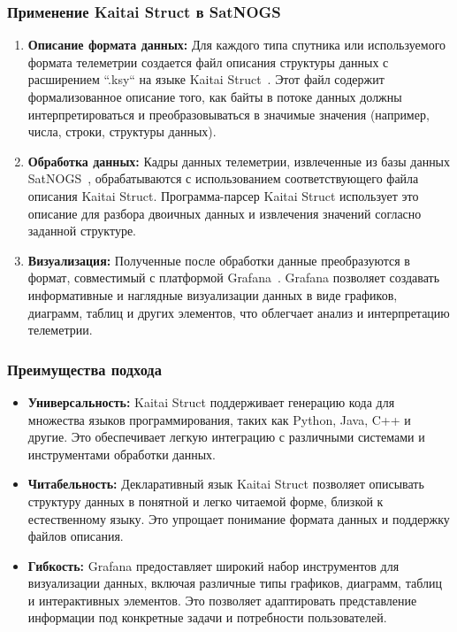 \documentclass[14pt, a4paper]{../cls/coursework}
\begin{document}
    \subsubsection{Применение Kaitai Struct в SatNOGS}

    \begin{enumerate}
        \item \textbf{Описание формата данных:} Для каждого типа спутника или используемого формата телеметрии создается файл описания структуры данных с расширением ``.ksy`` на языке Kaitai Struct~\cite{katai_docs}.
        Этот файл содержит формализованное описание того, как байты в потоке данных должны интерпретироваться и преобразовываться в значимые значения (например, числа, строки, структуры данных).
        \item \textbf{Обработка данных:} Кадры данных телеметрии, извлеченные из базы данных SatNOGS~\cite{satnogs_database_docs}, обрабатываются с использованием соответствующего файла описания Kaitai Struct.
        Программа-парсер Kaitai Struct использует это описание для разбора двоичных данных и извлечения значений согласно заданной структуре.
        \item \textbf{Визуализация:} Полученные после обработки данные преобразуются в формат, совместимый с платформой Grafana~\cite{grafana_docs}.
        Grafana позволяет создавать информативные и наглядные визуализации данных в виде графиков, диаграмм, таблиц и других элементов,  что облегчает анализ и интерпретацию телеметрии.
    \end{enumerate}

    \subsubsection{Преимущества подхода}

    \begin{itemize}[label={--}]
        \item \textbf{Универсальность:} Kaitai Struct поддерживает генерацию кода для множества языков программирования, таких как Python, Java, C++ и другие.
        Это обеспечивает легкую интеграцию с различными системами и инструментами обработки данных.
        \item \textbf{Читабельность:}  Декларативный язык Kaitai Struct позволяет описывать структуру данных в понятной и легко читаемой форме,  близкой к естественному языку.
        Это упрощает понимание формата данных и поддержку файлов описания.
        \item \textbf{Гибкость:} Grafana предоставляет широкий набор инструментов для визуализации данных, включая различные типы графиков, диаграмм, таблиц и интерактивных элементов.
        Это позволяет адаптировать представление информации под конкретные задачи и потребности пользователей.
    \end{itemize}
\end{document}
